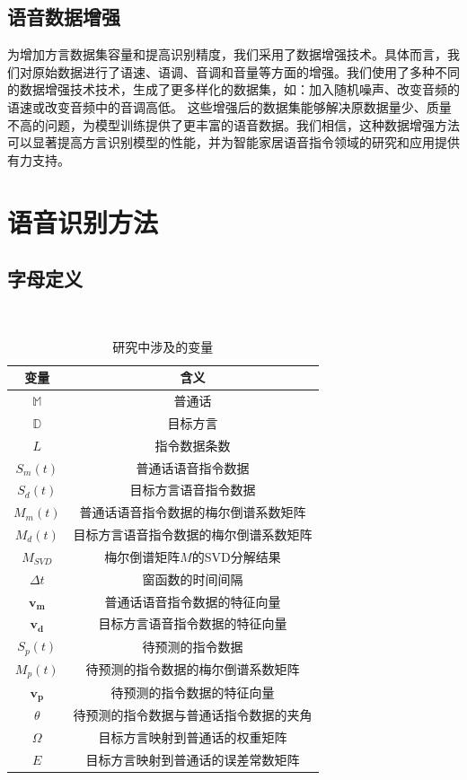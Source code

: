 \documentclass[lang=cn,cite=super]{elegantpaper}
\begin{document}
\subsection{语音数据增强}
为增加方言数据集容量和提高识别精度，我们采用了数据增强技术。具体而言，我们对原始数据进行了语速、语调、音调和音量等方面的增强。我们使用了多种不同的数据增强技术技术，生成了更多样化的数据集，如：加入随机噪声、改变音频的语速或改变音频中的音调高低。
这些增强后的数据集能够解决原数据量少、质量不高的问题，为模型训练提供了更丰富的语音数据。我们相信，这种数据增强方法可以显著提高方言识别模型的性能，并为智能家居语音指令领域的研究和应用提供有力支持。
\section{语音识别方法}
\subsection{字母定义}
\begin{table}[h]
    \caption{\label{tab:2} 研究中涉及的变量}\
    \begin{center}
        \begin{tabular}{cc}
            \hline
            \textbf{变量} & \textbf{含义}\\
            \hline \hline
            $\mathbb{M}$ & 普通话\\
            $\mathbb{D}$ & 目标方言\\
            $L$ & 指令数据条数\\
            $S_m(t)$ & 普通话语音指令数据\\
            $S_d(t)$ & 目标方言语音指令数据\\
            $M_m(t)$ & 普通话语音指令数据的梅尔倒谱系数矩阵\\
            $M_d(t)$ & 目标方言语音指令数据的梅尔倒谱系数矩阵\\
            $M_{SVD}$ & 梅尔倒谱矩阵$M$的SVD分解结果\\
            $\Delta t$ & 窗函数的时间间隔\\
            $\bm{v_m}$ & 普通话语音指令数据的特征向量\\
            $\bm{v_d}$ & 目标方言语音指令数据的特征向量\\
            $S_p(t)$ & 待预测的指令数据\\
            $M_p(t)$ & 待预测的指令数据的梅尔倒谱系数矩阵\\
            $\bm{v_p}$ & 待预测的指令数据的特征向量\\
            $\theta$ & 待预测的指令数据与普通话指令数据的夹角\\
            $\Omega$ & 目标方言映射到普通话的权重矩阵\\
            $E$ & 目标方言映射到普通话的误差常数矩阵\\
            \hline
        \end{tabular}
    \end{center}
\end{table}
\end{document}

